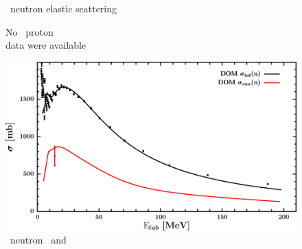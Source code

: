 \begin{figure}[hbtp]
\begin{minipage}{0.47\textwidth}
        \caption*{\oEight\ neutron elastic scattering}
        \label{DOMFitData_o18_neutron_elastic}
    \end{minipage}
\end{figure}
\vspace{0.70in}
\begin{figure}[hbtp]
    \centering
    \begin{minipage}{0.47\textwidth}
        \centering
        No \oEight\ proton \rxn\\ data were available
        \label{DOMFitData_o18_proton_inelastic}
    \end{minipage}\hspace{6pt}
    \begin{minipage}{0.47\textwidth}
        \centering
        \includegraphics[width=\textwidth]{figures/o18_neutronInelastic.png}
        \caption*{\oEight\ neutron \rxn\ and \tot}
        \label{DOMFitData_o18_neutron_inelastic}
    \end{minipage}
\end{figure}
